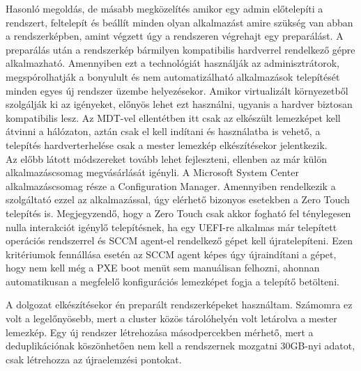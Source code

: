 \documentclass[12pt,oneside,justify,table]{book}
\begin{document}
Hasonló megoldás, de másabb megközelítés amikor egy admin előtelepíti a rendszert, feltelepít és beállít minden olyan alkalmazást amire szükség van abban a rendszerképben, amint végzett úgy a rendszeren végrehajt egy preparálást. A preparálás után a rendszerkép bármilyen kompatibilis hardverrel rendelkező gépre alkalmazható. Amennyiben ezt a technológiát használják az adminisztrátorok, megspórolhatják a bonyulult és nem automatizálható alkalmazások telepítését minden egyes új rendszer üzembe helyezésekor. Amikor virtualizált környezetből szolgálják ki az igényeket, előnyös lehet ezt használni, ugyanis a hardver biztosan kompatibilis lesz. Az MDT-vel ellentétben itt csak az elkészült lemezképet kell átvinni a hálózaton, aztán csak el kell indítani és használatba is vehető, a telepítés hardverterhelése csak a mester lemezkép elkészítésekor jelentkezik. \\

Az előbb látott módszereket tovább lehet fejleszteni, ellenben az már külön alkalmazáscsomag megvásárlását igényli. A Microsoft System Center alkalmazáscsomag része a Configuration Manager. Amennyiben rendelkezik a szolgáltató ezzel az alkalmazással, úgy elérhető bizonyos esetekben a Zero Touch telepítés is. Megjegyzendő, hogy a Zero Touch csak akkor fogható fel ténylegesen nulla interakciót igénylő telepítésnek, ha egy UEFI-re alkalmas már telepített operációs rendszerrel és SCCM agent-el rendelkező gépet kell újratelepíteni. Ezen kritériumok fennállása esetén az SCCM agent képes úgy újraindítani a gépet, hogy nem kell még a PXE boot menüt sem manuálisan felhozni, ahonnan automatikusan a megfelelő konfigurációs lemezképet fogja a telepítő betölteni. 

A dolgozat elkészítésekor én preparált rendszerképeket használtam. Számomra ez volt a legelőnyösebb, mert a cluster közös tárolóhelyén volt letárolva a mester lemezkép. Egy új rendszer létrehozása másodpercekben mérhető, mert a deduplikációnak köszönhetően nem kell a rendszernek mozgatni 30GB-nyi adatot, csak létrehozza az újraelemzési pontokat.  
\end{document}
